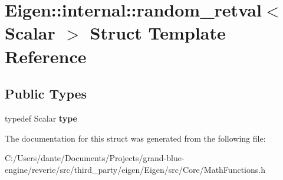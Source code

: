 \hypertarget{struct_eigen_1_1internal_1_1random__retval}{}\section{Eigen\+::internal\+::random\+\_\+retval$<$ Scalar $>$ Struct Template Reference}
\label{struct_eigen_1_1internal_1_1random__retval}
\subsection*{Public Types}
\begin{DoxyCompactItemize}
\item 
\mbox{\label{struct_eigen_1_1internal_1_1random__retval_ae3ee34bba049763ec7184efeaff71a52}} 
typedef Scalar {\bfseries type}
\end{DoxyCompactItemize}


The documentation for this struct was generated from the following file\+:\begin{DoxyCompactItemize}
\item 
C\+:/\+Users/dante/\+Documents/\+Projects/grand-\/blue-\/engine/reverie/src/third\+\_\+party/eigen/\+Eigen/src/\+Core/Math\+Functions.\+h\end{DoxyCompactItemize}
